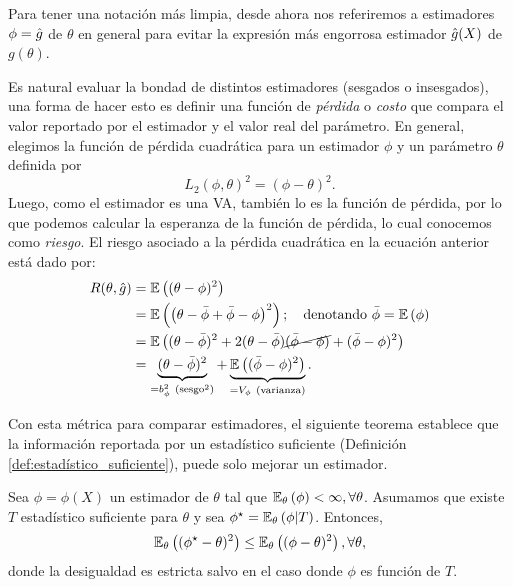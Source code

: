 Para tener una notación más limpia, desde ahora nos referiremos a estimadores $\phi={ \hat{g}}$ de $\theta$ en general para evitar la expresión más engorrosa estimador ${ \hat{g}}(X)$ de $g(\theta)$.



Es natural evaluar la bondad de distintos estimadores (sesgados o insesgados), una forma de hacer esto es definir una función de \textit{pérdida} o \textit{costo} que compara el valor reportado por el estimador y el valor real del parámetro. En general, elegimos la función de pérdida cuadrática para un estimador $\phi$ y un parámetro $\theta$ definida por 
\begin{equation}
	L_2(\phi,\theta)^2 = (\phi - \theta)^2.
\end{equation}
Luego, como el estimador es una VA, también lo es la función de pérdida, por lo que podemos calcular la esperanza de la función de pérdida, lo cual conocemos como \textit{riesgo}. El riesgo asociado a la pérdida cuadrática en la ecuación anterior está dado por: 
\begin{alignat}{3}
 	R(\theta, \hat{g})  &= \E{(\theta - \phi)^2}\nonumber\\
 						& = \E{\left(\theta - \bar{\phi}+ \bar{\phi} -\phi\right)^2}; \quad \text{denotando }\bar{\phi} = \E{ \phi}\nonumber\\
 						& = \E{(\theta - \bar{\phi})^2+2(\theta - \bar{\phi})\cancel{(\bar{\phi} -\phi)} +  (\bar{\phi} -\phi)^2}\nonumber\\
 						& = \underbrace{(\theta - \bar{\phi})^2}_{=b_{\phi}^2\ (\text{sesgo}^2)} +  \underbrace{\E{(\bar{\phi} -\phi)^2}}_{=V_{\phi}\ \text{(varianza)}}.\label{eq:riesgo_cuad}
 \end{alignat} 


Con esta métrica para comparar estimadores, el siguiente teorema establece que la información reportada por un estadístico suficiente (Definición \ref{def:estadístico_suficiente}), puede solo mejorar un estimador. 

\begin{theorem}
	\label{teo:rao-blackwell}
	Sea $\phi = \phi(X)$ un estimador de $\theta$ tal que $\mathbb{E}_\theta \left(\phi\right)<\infty, \forall \theta$. Asumamos que existe $T$ estadístico suficiente para $\theta$ y sea $\phi^\star = \mathbb{E}_\theta \left(\phi|T\right)$. Entonces, 
	\begin{equation}
		\mathbb{E}_\theta \left((\phi^\star-\theta)^2\right) \leq \mathbb{E}_\theta \left((\phi-\theta)^2\right), \forall\theta,
	\end{equation}
	donde la desigualdad es estricta salvo en el caso donde $\phi$ es función de $T$.
\end{theorem}


